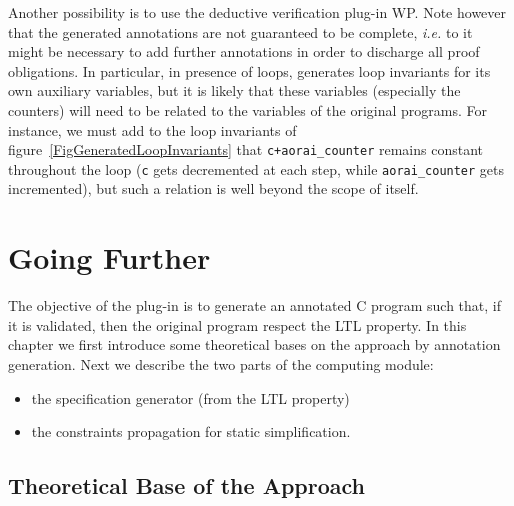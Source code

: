 \documentclass{report}
\begin{document}
Another possibility is to use the deductive verification plug-in WP.
Note however that the generated annotations are not guaranteed to be complete,
{\it i.e.} to it might be necessary to add further annotations in order to
discharge all proof obligations. In particular, in presence of loops, \aorai 
generates loop invariants for its own auxiliary variables, but it is likely that
these variables (especially the counters) will need to be related to the
variables of the original programs. For instance, we must add to the loop
invariants of figure~\ref{FigGeneratedLoopInvariants} that
\lstinline{c+aorai_counter} remains constant throughout the loop (\lstinline|c|
gets decremented at each step, while \lstinline|aorai_counter| gets
incremented), but such a relation is well beyond the scope of \aorai itself.

\chapter{Going Further}
\label{hackers_guide}
The objective of the \aorai plug-in is to generate an annotated C program such that, if it is validated, then the original program respect the LTL property.
In this chapter we first introduce some theoretical bases on the approach by annotation generation. Next we describe the two parts of the computing module:
\begin{itemize}
  \item the specification generator (from the LTL property)
  \item the constraints propagation for static simplification.
\end{itemize}

\section{Theoretical Base of the Approach}
\end{document}
